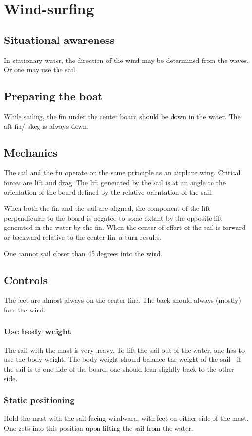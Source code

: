 \documentclass[oneside, article]{memoir}
\begin{document}
\chapter{Wind-surfing}
\section{Situational awareness}
In stationary water, the direction of the wind may be determined from the waves. Or one may use the sail.

\section{Preparing the boat}
While sailing, the fin under the center board should be down in the water. The aft fin/ skeg is always down.

\section{Mechanics}
The sail and the fin operate on the same principle as an airplane wing. Critical forces are lift and drag. The lift generated by the sail is at an angle to the orientation of the board defined by the relative orientation of the sail. 

When both the fin and the sail are aligned, the component of the lift perpendicular to the board is negated to some extant by the opposite lift generated in the water by the fin. When the center of effort of the sail is forward or backward relative to the center fin, a turn results.

One cannot sail closer than 45 degrees into the wind.

\section{Controls}
The feet are almost always on the center-line. The back should always (mostly) face the wind.

\subsection{Use body weight}
The sail with the mast is very heavy. To lift the sail out of the water, one has to use the body weight. The body weight should balance the weight of the sail - if the sail is to one side of the board, one should lean slightly back to the other side.

\subsection{Static positioning}
Hold the mast with the sail facing windward, with feet on either side of the mast. One gets into this position upon lifting the sail from the water.
\end{document}
